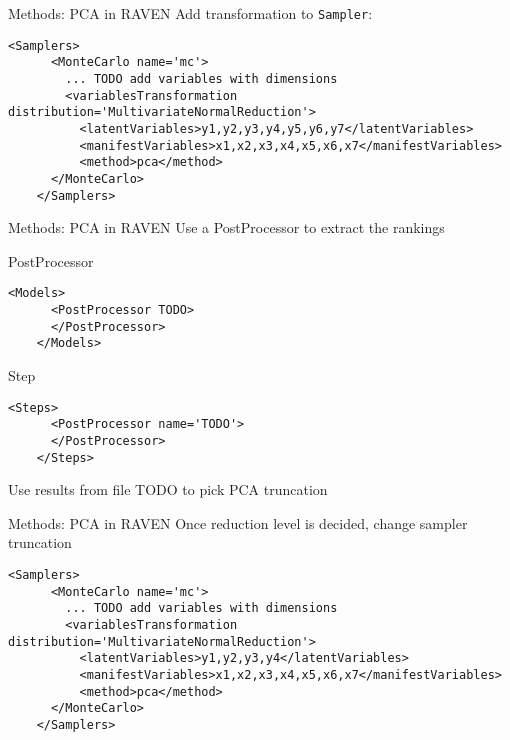 \documentclass[t,9pt,svgnames]{beamer}
\newenvironment{codebox}{}{}
\newcommand{\code}[1]{\texttt{#1}}
\begin{document}
\begin{frame}[fragile]{Methods: PCA in RAVEN}
Add transformation to \code{Sampler}:
\begin{codebox}
  \begin{lstlisting}[emph={variablesTransformation,latentVariables,manifestVariables}]
    <Samplers>
      <MonteCarlo name='mc'>
        ... TODO add variables with dimensions
        <variablesTransformation distribution='MultivariateNormalReduction'>
          <latentVariables>y1,y2,y3,y4,y5,y6,y7</latentVariables>
          <manifestVariables>x1,x2,x3,x4,x5,x6,x7</manifestVariables>
          <method>pca</method>
      </MonteCarlo>
    </Samplers>
\end{lstlisting}
\end{codebox}
\end{frame}

\begin{frame}[fragile]{Methods: PCA in RAVEN}
  Use a PostProcessor to extract the rankings

  PostProcessor
  \begin{codebox}
    \begin{lstlisting}[emph={PostProcessor}]
    <Models>
      <PostProcessor TODO>
      </PostProcessor>
    </Models>
    \end{lstlisting}
  \end{codebox}
  Step
  \begin{codebox}
    \begin{lstlisting}[emph={PostProcessor}]
    <Steps>
      <PostProcessor name='TODO'>
      </PostProcessor>
    </Steps>
    \end{lstlisting}
  \end{codebox}
Use results from file TODO to pick PCA truncation
\end{frame}

\begin{frame}[fragile]{Methods: PCA in RAVEN}
  Once reduction level is decided, change sampler truncation
\begin{codebox}
  \begin{lstlisting}[emph={y1,y2,y3}]
    <Samplers>
      <MonteCarlo name='mc'>
        ... TODO add variables with dimensions
        <variablesTransformation distribution='MultivariateNormalReduction'>
          <latentVariables>y1,y2,y3,y4</latentVariables>
          <manifestVariables>x1,x2,x3,x4,x5,x6,x7</manifestVariables>
          <method>pca</method>
      </MonteCarlo>
    </Samplers>
\end{lstlisting}
\end{codebox}
\end{frame}
\end{document}
